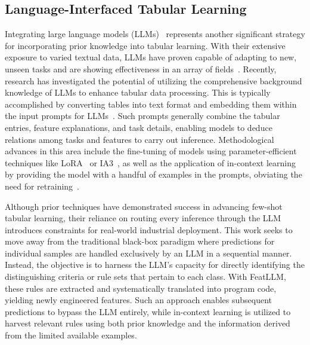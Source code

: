 \subsection{Language-Interfaced Tabular Learning} Integrating large language models (LLMs)~\cite{anil2023palm,openai2023gpt4} represents another significant strategy for incorporating prior knowledge into tabular learning. With their extensive exposure to varied textual data, LLMs have proven capable of adapting to new, unseen tasks and are showing effectiveness in an array of fields~\cite{brown2020language}. Recently, research has investigated the potential of utilizing the comprehensive background knowledge of LLMs to enhance tabular data processing. This is typically accomplished by converting tables into text format and embedding them within the input prompts for LLMs~\cite{dinh2022lift,hegselmann2023tabllm,wang2023anypredict}. Such prompts generally combine the tabular entries, feature explanations, and task details, enabling models to deduce relations among tasks and features to carry out inference. Methodological advances in this area include the fine-tuning of models using parameter-efficient techniques like LoRA~\cite{hu2021lora} or IA3~\cite{liu2022few}, as well as the application of in-context learning by providing the model with a handful of examples in the prompts, obviating the need for retraining~\cite{dinh2022lift,hegselmann2023tabllm,nam2023semi,slack2023tablet}.

Although prior techniques have demonstrated success in advancing few-shot tabular learning, their reliance on routing every inference through the LLM introduces constraints for real-world industrial deployment. This work seeks to move away from the traditional black-box paradigm where predictions for individual samples are handled exclusively by an LLM in a sequential manner. Instead, the objective is to harness the LLM’s capacity for directly identifying the distinguishing criteria or rule sets that pertain to each class. With \textsf{FeatLLM}, these rules are extracted and systematically translated into program code, yielding newly engineered features. Such an approach enables subsequent predictions to bypass the LLM entirely, while in-context learning is utilized to harvest relevant rules using both prior knowledge and the information derived from the limited available examples.

